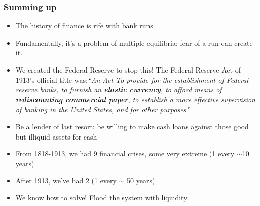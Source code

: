\documentclass{beamer}
\begin{document}
\begin{frame}
\frametitle{Summing up}
\begin{itemize}
\item<1-> The history of finance is rife with bank runs
\smallskip
\item<2-> Fundamentally, it's a problem of multiple equilibria: fear of a run can create it.
\smallskip
\item<3-> We created the Federal Reserve to stop this! 
The Federal Reserve Act of 1913's official title was:\emph{``An Act To provide for the establishment of Federal reserve banks, to furnish an \textbf{elastic currency}, to afford means of \textbf{rediscounting commercial paper}, to establish a more effective supervision of banking in the United States, and for other purposes"}
\smallskip
\item<4-> Be a lender of last resort: be willing to make cash loans against those good but illiquid assets for cash
\smallskip
\item<5-> From 1818-1913, we had 9 financial crises, some very extreme (1 every $\sim$10 years)
\smallskip
\item<6-> After 1913, we've had 2 (1 every $\sim$ 50 years)
\smallskip
\item<7-> We know how to solve! Flood the system with liquidity.
\end{itemize}
\end{frame}
\end{document}
